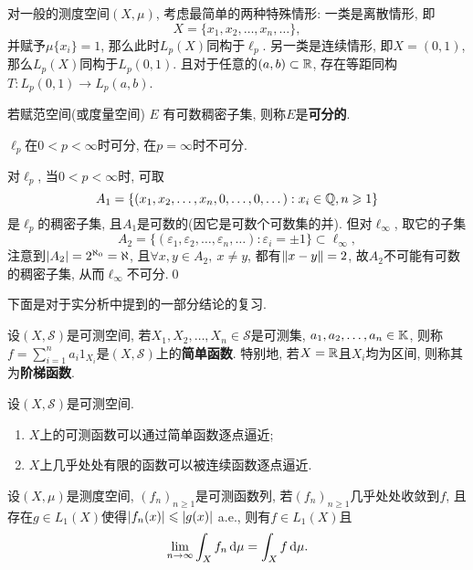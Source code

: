     对一般的测度空间$ (X,\mu) $, 考虑最简单的两种特殊情形: 一类是离散情形, 即
    \[
    X=\{ x_1,x_2, \dots,x_n, \dots \},
    \]
    并赋予$ \mu\{x_i\}=1 $, 那么此时$ L_p(X) $同构于$ \ell_p $. 另一类是连续情形, 即$ X=(0,1) $, 那么$ L_p(X) $同构于$ L_p(0,1) $. 且对于任意的$ (a,b)\subset\mathbb{R} $, 存在等距同构$ T : L_p(0,1)\to L_p(a,b) $.

    \begin{Definition}[可分性]
    若赋范空间(或度量空间) $ E $ 有可数稠密子集, 则称$ E $是\textbf{可分的}.
    \end{Definition}

    \begin{Proposition}
    $ \ell_p $在$ 0<p<\infty $时可分, 在$ p=\infty $时不可分.
    \end{Proposition}
    \begin{Proof}
    对$ \ell_p $, 当$ 0<p<\infty $时, 可取
    \[
    A_1=\{ (x_1,x_2, \dots,x_n,0, \dots,0, \dots) : x_i\in\mathbb{Q}, n\geqslant 1 \}
    \]
    是$ \ell_p $的稠密子集, 且$ A_1 $是可数的(因它是可数个可数集的并). 但对$ \ell_\infty $, 取它的子集
    \[
    A_2=\{ (\varepsilon_1,\varepsilon_2, \dots,\varepsilon_n, \dots) : \varepsilon_i=\pm 1 \}\subset\ell_\infty,
    \]
    注意到$ \left| A_2 \right| =2^{\aleph_0}=\aleph $, 且$ \forall x,y\in A_2,\ x\ne y $, 都有$ \left\| x-y \right\|=2 $, 故$ A_2 $不可能有可数的稠密子集, 从而$ \ell_\infty $不可分.\qed
    \end{Proof}

    下面是对于实分析中提到的一部分结论的复习.

    \begin{Definition}[简单函数]
    设$ (X,\mathcal S) $是可测空间, 若$ X_1,X_2, \dots,X_n\in\mathcal S $是可测集, $ a_1,a_2, \dots,a_n\in\mathbb{K} $, 则称$ f=\sum\limits_{i=1}^na_i1_{X_i} $是$ (X,\mathcal S) $上的\textbf{简单函数}. 特别地, 若$ X=\mathbb{R} $且$ X_i $均为区间, 则称其为\textbf{阶梯函数}.
    \end{Definition}

    \begin{Proposition}
    设$ (X,\mathcal S) $是可测空间.
    \begin{enumerate}[(1)]
    \item $ X $上的可测函数可以通过简单函数逐点逼近;
    \item $ X $上几乎处处有限的函数可以被连续函数逐点逼近.
    \end{enumerate}
    \end{Proposition}

    \begin{Theorem}[Lebesgue控制收敛定理]
    设$ (X,\mu) $是测度空间, $ (f_n)_{n\geqslant 1} $是可测函数列, 若$ (f_n)_{n\geqslant 1} $几乎处处收敛到$ f $, 且存在$ g\in L_1(X) $使得$ \left| f_n(x) \right| \leqslant\left| g(x) \right|  $ a.e., 则有$ f\in L_1(X) $且
    \[
    \lim_{n\to\infty}\int_Xf_n\,\mathrm{d}\mu=\int_Xf\,\mathrm{d}\mu.
    \]
    \end{Theorem}

